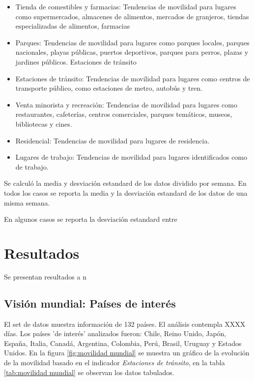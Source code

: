 \documentclass{article}
\begin{document}
\begin{itemize}
	\item Tienda de comestibles y farmacias: Tendencias de movilidad para lugares como supermercados, almacenes de alimentos, mercados de granjeros, tiendas especializadas de alimentos, farmacias
	\item Parques: Tendencias de movilidad para lugares como parques locales, parques nacionales, playas públicas, puertos deportivos, parques para perros, plazas y jardines públicos.
	Estaciones de tránsito
	\item Estaciones de tránsito: Tendencias de movilidad para lugares como centros de transporte público, como estaciones de metro, autobús y tren.
	\item Venta minorista y recreación:	Tendencias de movilidad para lugares como restaurantes, cafeterías, centros comerciales, parques temáticos, museos, bibliotecas y cines.
	\item Residencial: Tendencias de movilidad para lugares de residencia.
	\item Lugares de trabajo: Tendencias de movilidad para lugares identificados como de trabajo.
	
\end{itemize}

Se calculó la media y desviación estandard de los datos dividido por semana. En todos los casos se reporta la media y la desviación estandard de los datos de una misma semana.

En algunos casos se reporta la desviación estandard entre

\section{Resultados}

Se presentan resultados a n


\subsection{Visión mundial: Países de interés}
El set de datos muestra información de 132 países. El análisis contempla XXXX días.
Los países 'de interés' analizados fueron: Chile, Reino Unido, Japón, España, Italia, Canadá, Argentina, Colombia, Perú, Brasil, Uruguay y Estados Unidos. En la figura \ref{fig:movilidad mundial} se muestra un gráfico de la evolución de la movilidad basado en el indicador \textit{Estaciones de tránsito}, en la tabla \ref{tab:movilidad mundial} se observan los datos tabulados.
\end{document}

